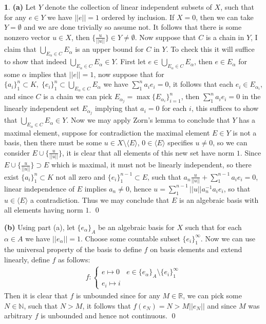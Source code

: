 \documentclass[11pt]{article}
\theoremstyle{definition}
\newtheorem{pb}{}
\newcommand{\set}[1]{\{#1\}}
\newcommand{\norm}[1]{\lvert\lvert#1\rvert\rvert}
\newcommand{\gen}[1]{\langle #1 \rangle}
\begin{document}
    \begin{pb}
        \textbf{(a)} Let \(Y\) denote the collection of linear independent subsets of \(X\), such that for any \(e \in Y\) we have \(\norm{e} = 1\) ordered by inclusion. If \(X = 0\), then we can take \(Y = \emptyset\) and we are done trivially so assume not. It follows that there is some nonzero vector \(u \in X\), then \(\set{\frac{u}{\norm{u}}} \in Y \neq \emptyset\). Now suppose that \(C\) is a chain in \(Y\), I claim that \(\bigcup_{E_\alpha \in C}E_\alpha\) is an upper bound for \(C\) in \(Y\). To check this it will suffice to show that indeed \(\bigcup_{E_\alpha \in C}E_\alpha \in Y\). First let \(e \in \bigcup_{E_\alpha \in C}E_\alpha\), then \(e \in E_\alpha\) for some \(\alpha\) implies that \(\norm{e} = 1\), now suppose that for \(\set{a_i}_1^n \subset K, \; \set{e_i}_1^n \subset \bigcup_{E_\alpha \in C}E_\alpha\) we have \(\sum_1^n a_i e_i = 0\), it follows that each \(e_i \in E_{\alpha_i}\), and since \(C\) is a chain we can pick \(E_{\alpha_j} = \max\set{E_{\alpha_i}}_{i=1}^n\), then \(\sum_1^n a_i e_i = 0\) in the linearly independent set \(E_{\alpha_j}\) implying that \(a_i = 0\) for each \(i\), this suffices to show that \(\bigcup_{E_\alpha \in C}E_\alpha \in Y\). Now we may apply Zorn's lemma to conclude that \(Y\) has a maximal element, suppose for contradiction the maximal element \(E \in Y\) is not a basis, then there must be some \(u \in X \setminus \gen{E}\), \(0 \in \gen{E}\) specifies \(u \neq 0\), so we can consider \(E \cup \set{\frac{u}{\norm{u}}}\), it is clear that all elements of this new set have norm \(1\). Since \(E \cup \set{\frac{u}{\norm{u}}} \supset E\) which is maximal, it must not be linearly independent, so there exist \(\set{a_i}_1^n \subset K\) not all zero and \(\set{e_i}_1^{n-1} \subset E\), such that \(a_n \frac{u}{\norm{u}} + \sum_1^{n-1} a_i e_i = 0\), linear independence of \(E\) implies \(a_n \neq 0\), hence
        \(u = \sum_{1}^{n-1}\norm{u}a_n^{-1}a_i e_i\), so that \(u \in \gen{E}\) a contradiction. Thus we may conclude that \(E\) is an algebraic basis with all elements having norm \(1\). \qed

        \textbf{(b)} Using part (a), let \(\set{e_\alpha}_A\) be an algebraic basis for \(X\) such that for each \(\alpha \in A\) we have \(\norm{e_\alpha} = 1\). Choose some countable subset \(\set{e_i}_1^\infty\). Now we can use the universal property of the basis to define \(f\) on basis elements and extend linearly, define \(f\) as follows:
        \begin{align*}
            f: \begin{cases}
                e \mapsto 0 & e \in \set{e_\alpha}_A \setminus \set{e_i}_1^\infty \\
                e_i \mapsto i
            \end{cases}
        \end{align*}
        Then it is clear that \(f\) is unbounded since for any \(M \in \mathbb{R}\), we can pick some \(N \in \mathbb{N}\), such that \(N > M\), it follows that
        \(f(e_N) = N > M\norm{e_N}\) and since \(M\) was arbitrary \(f\) is unbounded and hence not continuous. \qed


\end{pb}
\end{document}

